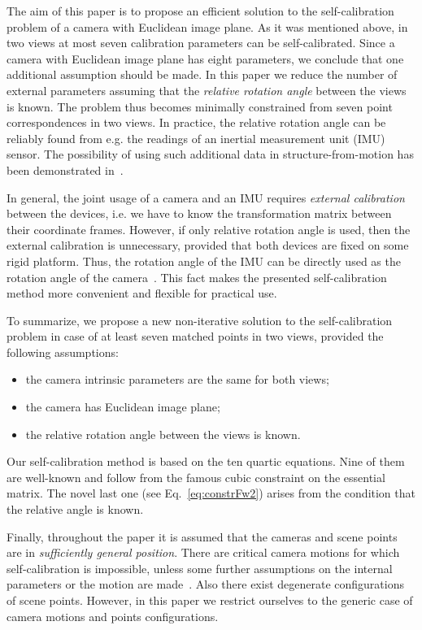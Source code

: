 \documentclass[reqno]{amsart}
\theoremstyle{plain}
\begin{document}
The aim of this paper is to propose an efficient solution to the self-calibration problem of a camera with Euclidean image plane. As it was mentioned above, in two views at most seven calibration parameters can be self-calibrated. Since a camera with Euclidean image plane has eight parameters, we conclude that one additional assumption should be made. In this paper we reduce the number of external parameters assuming that the \emph{relative rotation angle} between the views is known. The problem thus becomes minimally constrained from seven point correspondences in two views. In practice, the relative rotation angle can be reliably found from e.g. the readings of an inertial measurement unit (IMU) sensor. The possibility of using such additional data in structure-from-motion has been demonstrated in~\cite{LHLP}.

In general, the joint usage of a camera and an IMU requires \emph{external calibration} between the devices, i.e. we have to know the transformation matrix between their coordinate frames. However, if only relative rotation angle is used, then the external calibration is unnecessary, provided that both devices are fixed on some rigid platform. Thus, the rotation angle of the IMU can be directly used as the rotation angle of the camera~\cite{LHLP}. This fact makes the presented self-calibration method more convenient and flexible for practical use.

To summarize, we propose a new non-iterative solution to the self-calibration problem in case of at least seven matched points in two views, provided the following assumptions:
\begin{itemize}
\item the camera intrinsic parameters are the same for both views;
\item the camera has Euclidean image plane;
\item the relative rotation angle between the views is known.
\end{itemize}

Our self-calibration method is based on the ten quartic equations. Nine of them are well-known and follow from the famous cubic constraint on the essential matrix. The novel last one (see Eq.~\eqref{eq:constrFw2}) arises from the condition that the relative angle is known.

Finally, throughout the paper it is assumed that the cameras and scene points are in \emph{sufficiently general position}. There are critical camera motions for which self-calibration is impossible, unless some further assumptions on the internal parameters or the motion are made~\cite{Sturm2}. Also there exist degenerate configurations of scene points. However, in this paper we restrict ourselves to the generic case of camera motions and points configurations.
\end{document}
